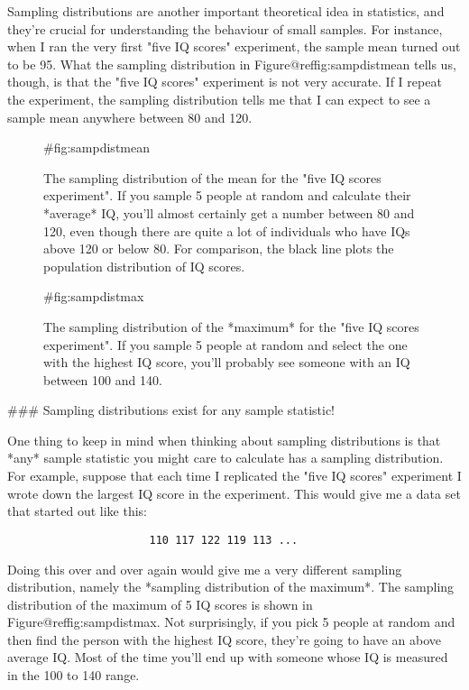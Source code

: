 Sampling distributions are another important theoretical idea in statistics, and they're crucial for understanding the behaviour of small samples. For instance, when I ran the very first "five IQ scores" experiment, the sample mean turned out to be 95. What the sampling distribution in Figure@reffig:sampdistmean tells us, though, is that the "five IQ scores" experiment is not very accurate. If I repeat the experiment, the sampling distribution tells me that I can expect to see a sample mean anywhere between 80 and 120. 


\begin{figure}[p]
\begin{center}
\caption{The sampling distribution of the mean for the "five IQ scores experiment". If you sample 5 people at random and calculate their *average* IQ, you'll almost certainly get a number between 80 and 120, even though there are quite a lot of individuals who have IQs above 120 or below 80. For comparison, the black line plots the population distribution of IQ scores.}
{#fig:sampdistmean}
\HR
\end{center}
\end{figure}

\begin{figure}[p]
\begin{center}
\caption{The sampling distribution of the *maximum* for the "five IQ scores experiment". If you sample 5 people at random and select the one with the highest IQ score, you'll probably see someone with an IQ between 100 and 140.}
{#fig:sampdistmax}
\HR
\end{center}
\end{figure}


### Sampling distributions exist for any sample statistic!

One thing to keep in mind when thinking about sampling distributions is that *any* sample statistic you might care to calculate has a sampling distribution. For example, suppose that each time I replicated the "five IQ scores" experiment I wrote down the largest IQ score in the experiment. This would give me a data set that started out like this:
\begin{verbatim}
                      110 117 122 119 113 ... 
\end{verbatim}
Doing this over and over again would give me a very different sampling distribution, namely the *sampling distribution of the maximum*. The sampling distribution of the maximum of 5 IQ scores is shown in Figure@reffig:sampdistmax. Not surprisingly, if you pick 5 people at random and then find the person with the highest IQ score, they're going to have an above average IQ. Most of the time you'll end up with someone whose IQ is measured in the 100 to 140 range. 



